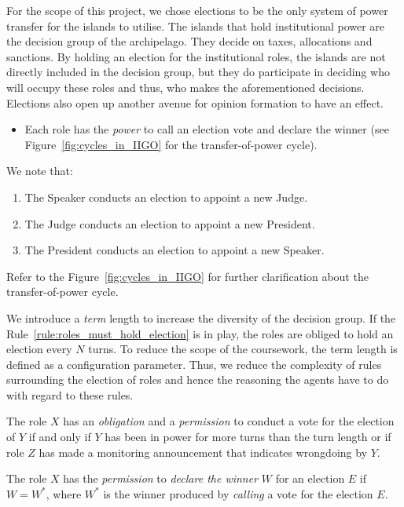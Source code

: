 For the scope of this project, we chose elections to be the only system of power transfer for the islands to utilise. The islands that hold institutional power are the decision group of the archipelago. They decide on taxes, allocations and sanctions. By holding an election for the institutional roles, the islands are not directly included in the decision group, but they do participate in deciding who will occupy these roles and thus, who makes the aforementioned decisions. Elections also open up another avenue for opinion formation to have an effect.
\begin{itemize}
    \item Each role has the \emph{power} to call an election vote and declare the winner (see Figure~\ref{fig:cycles_in_IIGO} for the transfer-of-power cycle).
\end{itemize}

We note that:
\begin{enumerate}
    \item The Speaker conducts an election to appoint a new Judge.
    \item The Judge conducts an election to appoint a new President.
    \item The President conducts an election to appoint a new Speaker.
\end{enumerate}
Refer to the Figure~\ref{fig:cycles_in_IIGO} for further clarification about the transfer-of-power cycle.

We introduce a \emph{term} length to increase the diversity of the decision group. If the Rule~\ref{rule:roles_must_hold_election} is in play, the roles are obliged to hold an election every $N$ turns. To reduce the scope of the coursework, the term length is defined as a configuration parameter. Thus, we reduce the complexity of rules surrounding the election of roles and hence the reasoning the agents have to do with regard to these rules.

\begin{rule_IIGO} \label{rule:roles_must_hold_election}
    The role $X$ has an \emph{obligation} and a \emph{permission} to conduct a vote for the election of $Y$ if and only if $Y$ has been in power for more turns than the turn length or if role $Z$ has made a monitoring announcement that indicates wrongdoing by $Y$.
\end{rule_IIGO}

\begin{rule_IIGO} \label{rule:must_appoint_elected_island}
    The role $X$ has the \emph{permission} to \emph{declare the winner} $W$ for an election $E$ if $W = W^{*}$, where $W^{*}$ is the winner produced by \emph{calling} a vote for the election $E$.
\end {rule_IIGO}

